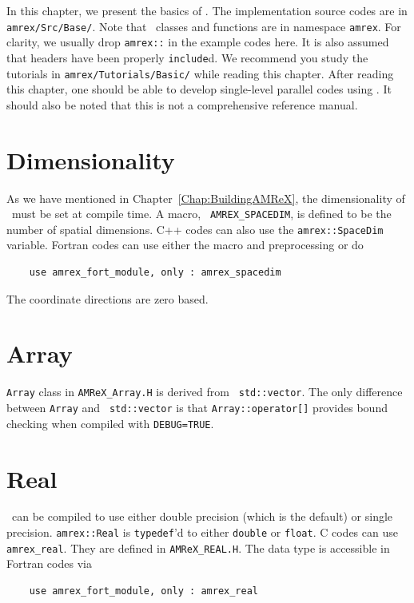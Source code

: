 In this chapter, we present the basics of \amrex.  The implementation
source codes are in {\tt amrex/Src/Base/}.  Note that \amrex\ classes
and functions are in namespace {\tt amrex}.  For clarity, we usually
drop {\tt amrex::} in the example codes here.  It is also assumed that
headers have been properly {\tt include}d.  We recommend you study
the tutorials in {\tt amrex/Tutorials/Basic/} while reading this chapter.
After reading this chapter, one should be able to develop single-level
parallel codes using \amrex.  It should also be noted that this is not
a comprehensive reference manual.

\section{Dimensionality}
\label{sec:basics:dim}

As we have mentioned in Chapter~\ref{Chap:BuildingAMReX}, the
dimensionality of \amrex\ must be set at compile time.  A macro, {\tt
  AMREX\_SPACEDIM}, is defined to be the number of spatial
dimensions.  C++ codes can also use the {\tt amrex::SpaceDim}
variable.  Fortran codes can use either the macro and preprocessing or
do 
\begin{verbatim}
    use amrex_fort_module, only : amrex_spacedim
\end{verbatim}
The coordinate directions are zero based.

\section{Array}

{\tt Array} class in {\tt AMReX\_Array.H} is derived from {\tt
  std::vector}.  The only difference between {\tt Array} and {\tt
  std::vector} is that {\tt Array::operator[]} provides bound checking
when compiled with {\tt DEBUG=TRUE}.

\section{Real}

\amrex\ can be compiled to use either double precision (which is the
default) or single precision.  {\tt amrex::Real} is {\tt typedef}'d to
either {\tt double} or {\tt float}.  C codes can use {\tt
  amrex\_real}.  They are defined in {\tt AMReX\_REAL.H}.  The data
type is accessible in Fortran codes via
\begin{verbatim}
    use amrex_fort_module, only : amrex_real
\end{verbatim}

